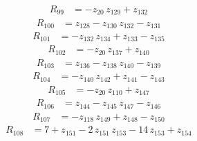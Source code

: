 \begin{equation*}\begin{aligned}
R_{99}&=-z_{20}\,z_{129} +z_{132}
\end{aligned}\end{equation*}
\begin{equation*}\begin{aligned}
R_{100}&=z_{128} -z_{130}\,z_{132} -z_{131}
\end{aligned}\end{equation*}
\begin{equation*}\begin{aligned}
R_{101}&=-z_{132}\,z_{134} +z_{133} -z_{135}
\end{aligned}\end{equation*}
\begin{equation*}\begin{aligned}
R_{102}&=-z_{20}\,z_{137} +z_{140}
\end{aligned}\end{equation*}
\begin{equation*}\begin{aligned}
R_{103}&=z_{136} -z_{138}\,z_{140} -z_{139}
\end{aligned}\end{equation*}
\begin{equation*}\begin{aligned}
R_{104}&=-z_{140}\,z_{142} +z_{141} -z_{143}
\end{aligned}\end{equation*}
\begin{equation*}\begin{aligned}
R_{105}&=-z_{20}\,z_{110} +z_{147}
\end{aligned}\end{equation*}
\begin{equation*}\begin{aligned}
R_{106}&=z_{144} -z_{145}\,z_{147} -z_{146}
\end{aligned}\end{equation*}
\begin{equation*}\begin{aligned}
R_{107}&=-z_{118}\,z_{149} +z_{148} -z_{150}
\end{aligned}\end{equation*}
\begin{equation*}\begin{aligned}
R_{108}&=7 +z_{151} -2\,z_{151}\,z_{153} -14\,z_{153} +z_{154}
\end{aligned}\end{equation*}
